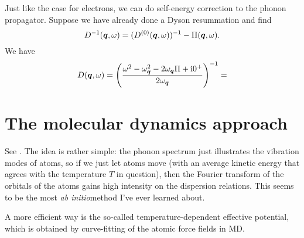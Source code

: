 \documentclass[hyperref, a4paper]{article}
\newcommand*{\ii}{\mathrm{i}}
\newcommand*{\abinitio}{\textit{ab initio}}
\begin{document}
Just like the case for electrons, 
we can do self-energy correction to the phonon propagator.
Suppose we have already done a Dyson resummation 
and find 
\begin{equation}
    D^{-1}(\vb*{q}, \omega) = (D^{(0)}(\vb*{q}, \omega))^{-1} - \Pi(\vb*{q}, \omega).
\end{equation}
We have 
\begin{equation}
    D(\vb*{q}, \omega) = \left(
        \frac{\omega^2 - \omega_{\vb*{q}}^2 - 2 \omega_{\vb*{q}} \Pi + \ii 0^+}{2 \omega_{\vb*{q}}}
    \right)^{-1}
    = 
\end{equation}

\section{The molecular dynamics approach}

See \cite{zhang2022finite}. 
The idea is rather simple: 
the phonon spectrum just illustrates 
the vibration modes of atoms,
so if we just let atoms move 
(with an average kinetic energy that agrees 
with the temperature $T$ in question),
then the Fourier transform 
of the orbitals of the atoms 
gains high intensity 
on the dispersion relations.
This seems to be the most \abinitio method I've ever learned about.

A more efficient way is the so-called temperature-dependent effective potential,
which is obtained by curve-fitting of the atomic force fields in MD.

\printbibliography
\end{document}
